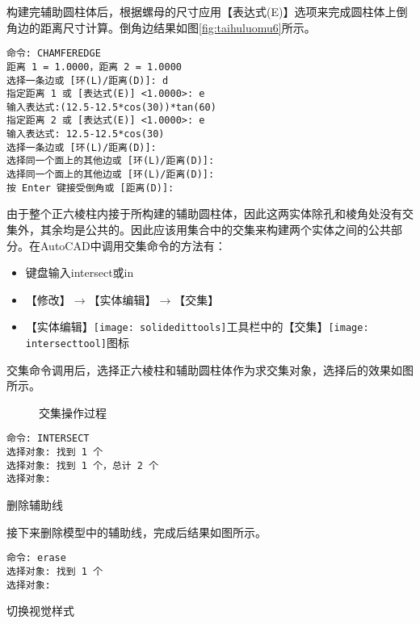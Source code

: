 \begin{procedure}
构建完辅助圆柱体后，根据螺母的尺寸应用【表达式(E)】选项来完成圆柱体上倒角边的距离尺寸计算。倒角边结果如图\ref{fig:taihuluomu6}所示。

\begin{lstlisting}
命令: CHAMFEREDGE
距离 1 = 1.0000，距离 2 = 1.0000
选择一条边或 [环(L)/距离(D)]: d
指定距离 1 或 [表达式(E)] <1.0000>: e
输入表达式:(12.5-12.5*cos(30))*tan(60) 
指定距离 2 或 [表达式(E)] <1.0000>: e
输入表达式: 12.5-12.5*cos(30)
选择一条边或 [环(L)/距离(D)]:
选择同一个面上的其他边或 [环(L)/距离(D)]:
选择同一个面上的其他边或 [环(L)/距离(D)]:
按 Enter 键接受倒角或 [距离(D)]:
\end{lstlisting}

由于整个正六棱柱内接于所构建的辅助圆柱体，因此这两实体除孔和棱角处没有交集外，其余均是公共的。因此应该用集合中的交集来构建两个实体之间的公共部分。在AutoCAD中调用交集命令的方法有：
\begin{itemize}
\item 键盘输入intersect或in
\item 【修改】$\rightarrow $【实体编辑】$\rightarrow $【交集】
\item 【实体编辑】\texttt{[image: solidedittools]}工具栏中的【交集】\texttt{[image: intersecttool]}图标
\end{itemize}

交集命令调用后，选择正六棱柱和辅助圆柱体作为求交集对象，选择后的效果如图 所示。

\begin{figure}[htbp]
\centering
{}\hspace{20pt}
\caption{交集操作过程}
\end{figure}

\begin{lstlisting}
命令: INTERSECT
选择对象: 找到 1 个
选择对象: 找到 1 个，总计 2 个
选择对象:
\end{lstlisting}

\item 删除辅助线

接下来删除模型中的辅助线，完成后结果如图所示。
\begin{lstlisting}
命令: erase
选择对象: 找到 1 个
选择对象:
\end{lstlisting}

\item 切换视觉样式


\end{procedure}
